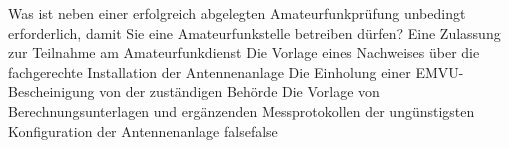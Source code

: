     {Was ist neben einer erfolgreich abgelegten Amateurfunkprüfung unbedingt erforderlich, damit Sie eine Amateurfunkstelle betreiben dürfen?}
    {Eine Zulassung zur Teilnahme am Amateurfunkdienst}
    {Die Vorlage eines Nachweises über die fachgerechte Installation der Antennenanlage}
    {Die Einholung einer EMVU-Bescheinigung von der zuständigen Behörde}
    {Die Vorlage von Berechnungsunterlagen und ergänzenden Messprotokollen der ungünstigsten Konfiguration der Antennenanlage}
    {false}{false}
